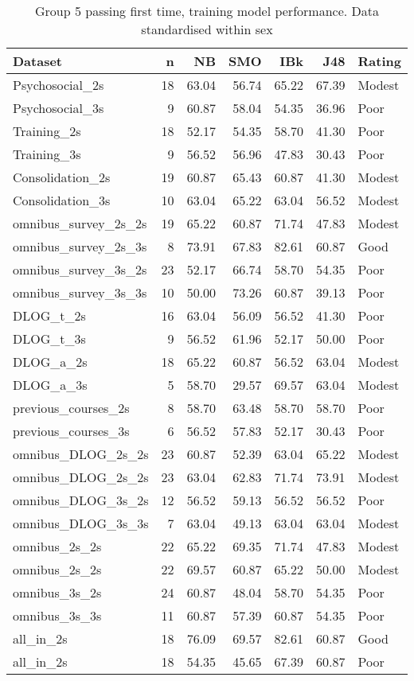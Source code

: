 \documentclass[a4paper,]{book}
\begin{document}
\begin{table}

\caption{\label{tab:g5-zsex-ftp-train-models}Group 5 passing first time, training model performance. Data standardised within sex}
\centering
\begin{tabular}[t]{lrrrrrl}
\toprule
Dataset & n & NB & SMO & IBk & J48 & Rating\\
\midrule
Psychosocial\_2s & 18 & 63.04 & 56.74 & 65.22 & 67.39 & Modest\\
Psychosocial\_3s & 9 & 60.87 & 58.04 & 54.35 & 36.96 & Poor\\
Training\_2s & 18 & 52.17 & 54.35 & 58.70 & 41.30 & Poor\\
Training\_3s & 9 & 56.52 & 56.96 & 47.83 & 30.43 & Poor\\
Consolidation\_2s & 19 & 60.87 & 65.43 & 60.87 & 41.30 & Modest\\
\addlinespace
Consolidation\_3s & 10 & 63.04 & 65.22 & 63.04 & 56.52 & Modest\\
omnibus\_survey\_2s\_2s & 19 & 65.22 & 60.87 & 71.74 & 47.83 & Modest\\
omnibus\_survey\_2s\_3s & 8 & 73.91 & 67.83 & 82.61 & 60.87 & Good\\
omnibus\_survey\_3s\_2s & 23 & 52.17 & 66.74 & 58.70 & 54.35 & Poor\\
omnibus\_survey\_3s\_3s & 10 & 50.00 & 73.26 & 60.87 & 39.13 & Poor\\
\addlinespace
DLOG\_t\_2s & 16 & 63.04 & 56.09 & 56.52 & 41.30 & Poor\\
DLOG\_t\_3s & 9 & 56.52 & 61.96 & 52.17 & 50.00 & Poor\\
DLOG\_a\_2s & 18 & 65.22 & 60.87 & 56.52 & 63.04 & Modest\\
DLOG\_a\_3s & 5 & 58.70 & 29.57 & 69.57 & 63.04 & Modest\\
previous\_courses\_2s & 8 & 58.70 & 63.48 & 58.70 & 58.70 & Poor\\
\addlinespace
previous\_courses\_3s & 6 & 56.52 & 57.83 & 52.17 & 30.43 & Poor\\
omnibus\_DLOG\_2s\_2s & 23 & 60.87 & 52.39 & 63.04 & 65.22 & Modest\\
omnibus\_DLOG\_2s\_2s & 23 & 63.04 & 62.83 & 71.74 & 73.91 & Modest\\
omnibus\_DLOG\_3s\_2s & 12 & 56.52 & 59.13 & 56.52 & 56.52 & Poor\\
omnibus\_DLOG\_3s\_3s & 7 & 63.04 & 49.13 & 63.04 & 63.04 & Modest\\
\addlinespace
omnibus\_2s\_2s & 22 & 65.22 & 69.35 & 71.74 & 47.83 & Modest\\
omnibus\_2s\_2s & 22 & 69.57 & 60.87 & 65.22 & 50.00 & Modest\\
omnibus\_3s\_2s & 24 & 60.87 & 48.04 & 58.70 & 54.35 & Poor\\
omnibus\_3s\_3s & 11 & 60.87 & 57.39 & 60.87 & 54.35 & Poor\\
all\_in\_2s & 18 & 76.09 & 69.57 & 82.61 & 60.87 & Good\\
\addlinespace
all\_in\_2s & 18 & 54.35 & 45.65 & 67.39 & 60.87 & Poor\\
\bottomrule
\end{tabular}
\end{table}
\end{document}
